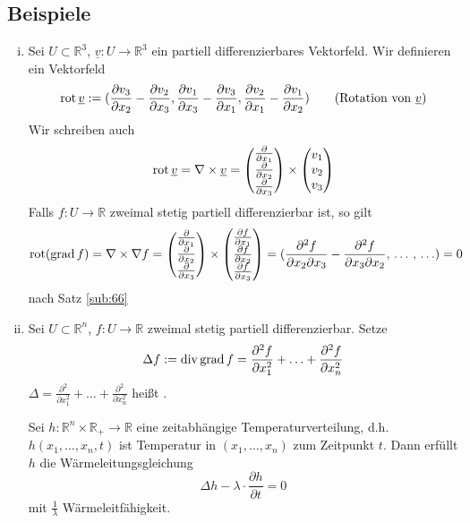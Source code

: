 \subsection{Beispiele} %
\label{sub:67}
\begin{enumerate}[(i)]
	\item Sei $U \subset \mathds{R}^3$, $\underline{v} : U \to \mathds{R}^3 $ ein partiell differenzierbares Vektorfeld. Wir definieren ein Vektorfeld 
	\[
		\rot \underline{v} := \enbrace{ \frac{\partial v_3}{\partial x_2} - \frac{\partial v_2}{\partial x_3} , \frac{\partial v_1}{\partial x_3} - 
		\frac{\partial v_3}{\partial x_1} ,  \frac{\partial v_2}{\partial x_1} - \frac{\partial v_1}{\partial x_2}      }  \tag{Rotation von $\underline{v}$}
	\]
	Wir schreiben auch 
	\[
		\operatorname{rot} \underline{v} = \nabla \times \underline{v}  = \begin{pmatrix}
			\frac{\partial}{\partial x_1} \\ \frac{\partial}{\partial x_2} \\ \frac{\partial}{\partial x_3}    
		\end{pmatrix} \times \begin{pmatrix}
			v_1 \\ v_2 \\v_3
		\end{pmatrix}
	\]
	Falls $f : U \to \mathds{R}$ zweimal stetig partiell differenzierbar ist, so gilt 
	\[
		 \operatorname{rot} (\operatorname{grad} f) = \nabla \times \nabla f = \begin{pmatrix}
			\frac{\partial}{\partial x_1} \\ \frac{\partial}{\partial x_2} \\ \frac{\partial}{\partial x_3}    
		\end{pmatrix} \times \begin{pmatrix}
			\frac{\partial f}{\partial x_1} \\ \frac{\partial f}{\partial x_2} \\ \frac{\partial f}{\partial x_3}    
		\end{pmatrix} = (\frac{\partial^2 f}{\partial x_2 \partial x_3} - \frac{\partial^2 f}{\partial x_3 \partial x_2}, \, \ldots \, , \, \ldots   ) = 0
	\]
	nach Satz \ref{sub:66}
	\item Sei $U \subset \mathds{R}^n$, $f : U \to \mathds{R}$ zweimal stetig partiell differenzierbar. Setze 
	\begin{align*}
		\Delta f := \operatorname{div} \operatorname{grad} f =  \frac{\partial^2 f}{\partial x_1^2} + \ldots  + \frac{\partial^2 f}{ \partial x_n^2}  
	\end{align*}
	$\Delta =  \frac{\partial^2 }{\partial x_1^2} + \ldots  + \frac{\partial^2 }{ \partial x_n^2}$ heißt . 
	
	Sei $h : \mathds{R}^n \times \mathds{R}_+ \to \mathds{R}$ eine zeitabhängige Temperaturverteilung, d.h. $h(x_1, \ldots , x_n, t)$ ist Temperatur in 
	$(x_1, \ldots , x_n)$ zum Zeitpunkt $t$. Dann erfüllt $h$ die Wärmeleitungsgleichung
	\[
		\Delta h - \lambda \cdot \frac{\partial h}{\partial t} = 0 
	\]
	mit $\frac{1}{\lambda } $ Wärmeleitfähigkeit.
\end{enumerate}
\newpage
